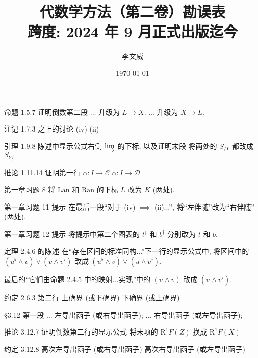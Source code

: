 \documentclass{AJerrata}
\title{\bfseries 代数学方法（第二卷）勘误表 \\ 跨度: 2024 年 9 月正式出版迄今 }
\author{李文威}
\date{\today}
\begin{document}
	\maketitle

	\begin{Errata}
		\item[命题 1.5.7 证明倒数第二段]
		\Orig ... 升级为 $L \to X$.
		\Corr ... 升级为 $X \to L$.
		
		\item[注记 1.7.3 之上的讨论]
		\Orig (iv)
		\Corr (ii)
		
		\item[引理 1.9.8 陈述中显示公式右侧 $\varinjlim$ 的下标, 以及证明末段]
		将两处的 $S_{/Y}$ 都改成 $S_{Y/}$
		
		\item[推论 1.11.14 证明第一行]
		\Orig $\alpha: I \to \mathcal{C}$
		\Corr $\alpha: I \to \mathcal{D}$
		
		\item[第一章习题 8]
		将 $\mathrm{Lan}$ 和 $\mathrm{Ran}$ 的下标 $L$ 改为 $K$ (两处).
		
		\item[第一章习题 11 提示] 在最后一段``对于 (iv) $\implies$ (ii)...'', 将``左伴随''改为``右伴随'' (两处).
		
		\item[第一章习题 12 提示] 将提示中第二个图表的 $t^\dagger$ 和 $b^\dagger$ 分别改为 $t$ 和 $b$.
		
		\item[定理 2.4.6 的陈述]
		在``存在区间的标准同构...''下一行的显示公式中, 将区间中的 $(u^{\flat} \wedge v) \vee (v \wedge v^{\flat})$ 改成 $(u^{\flat} \wedge v) \vee (u \wedge v^{\flat})$.
		
		最后的``它们由命题 2.4.5 中的映射...实现''中的 $(u \wedge v)$ 改成 $(u \wedge v^{\flat})$.
		
		\item[约定 2.6.3 第二行]
		\Orig 上确界 (或下确界)
		\Corr 下确界 (或上确界)
		
		\item[\S 3.12 第一段]
		\Orig ... 左导出函子 (或右导出函子);
		\Corr ... 右导出函子 (或左导出函子);
		
		\item[推论 3.12.7 证明倒数第二行的显示公式]
		将末项的 $\mathrm{R}^1 F(Z)$ 换成 $\mathrm{R}^1 F(X)$
		
		\item[约定 3.12.8]
		\Orig 高次左导出函子 (或右导出函子)
		\Corr 高次右导出函子 (或左导出函子)
		

\end{Errata}
\end{document}
